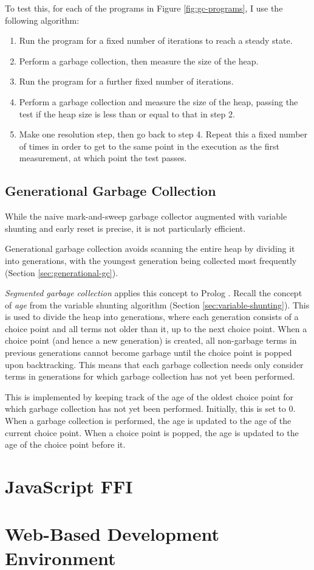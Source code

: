 To test this, for each of the programs in Figure \ref{fig:gc-programs}, I use the following algorithm:

\begin{enumerate}
\item Run the program for a fixed number of iterations to reach a steady state.
\item Perform a garbage collection, then measure the size of the heap.
\item Run the program for a further fixed number of iterations.
\item Perform a garbage collection and measure the size of the heap, passing the test if the heap size is less than or equal to that in step 2.
\item Make one resolution step, then go back to step 4. Repeat this a fixed number of times in order to get to the same point in the execution as the first measurement, at which point the test passes.
\end{enumerate}

\subsection{Generational Garbage Collection}

\label{sec:implementation-generational-gc}

While the naive mark-and-sweep garbage collector augmented with variable shunting and early reset is precise, it is not particularly efficient.

Generational garbage collection avoids scanning the entire heap by dividing it into generations, with the youngest generation being collected most frequently (Section \ref{sec:generational-gc}).

\emph{Segmented garbage collection} applies this concept to Prolog \cite{applebyGarbargecollectionProlog1988}. Recall the concept of \emph{age} from the variable shunting algorithm (Section \ref{sec:variable-shunting}). This is used to divide the heap into generations, where each generation consists of a choice point and all terms not older than it, up to the next choice point. When a choice point (and hence a new generation) is created, all non-garbage terms in previous generations cannot become garbage until the choice point is popped upon backtracking. This means that each garbage collection needs only consider terms in generations for which garbage collection has not yet been performed.

This is implemented by keeping track of the age of the oldest choice point for which garbage collection has not yet been performed. Initially, this is set to 0. When a garbage collection is performed, the age is updated to the age of the current choice point. When a choice point is popped, the age is updated to the age of the choice point before it.

\section{JavaScript FFI}

\label{sec:js-ffi}

\section{Web-Based Development Environment}